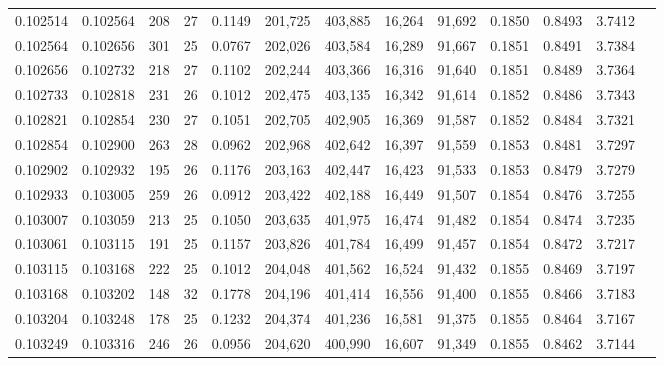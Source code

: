 \begin{tabular}{rrrrrrrrrrrrr}
0.102514 & 0.102564 & 208 &  27 &                                     0.1149 & 201,725 & 403,885 &  16,264 &  91,692 & 0.1850 & 0.8493 & 3.7412 \\
0.102564 & 0.102656 & 301 &  25 &                                     0.0767 & 202,026 & 403,584 &  16,289 &  91,667 & 0.1851 & 0.8491 & 3.7384 \\
0.102656 & 0.102732 & 218 &  27 &                                     0.1102 & 202,244 & 403,366 &  16,316 &  91,640 & 0.1851 & 0.8489 & 3.7364 \\
0.102733 & 0.102818 & 231 &  26 &                                     0.1012 & 202,475 & 403,135 &  16,342 &  91,614 & 0.1852 & 0.8486 & 3.7343 \\
0.102821 & 0.102854 & 230 &  27 &                                     0.1051 & 202,705 & 402,905 &  16,369 &  91,587 & 0.1852 & 0.8484 & 3.7321 \\
0.102854 & 0.102900 & 263 &  28 &                                     0.0962 & 202,968 & 402,642 &  16,397 &  91,559 & 0.1853 & 0.8481 & 3.7297 \\
0.102902 & 0.102932 & 195 &  26 &                                     0.1176 & 203,163 & 402,447 &  16,423 &  91,533 & 0.1853 & 0.8479 & 3.7279 \\
0.102933 & 0.103005 & 259 &  26 &                                     0.0912 & 203,422 & 402,188 &  16,449 &  91,507 & 0.1854 & 0.8476 & 3.7255 \\
0.103007 & 0.103059 & 213 &  25 &                                     0.1050 & 203,635 & 401,975 &  16,474 &  91,482 & 0.1854 & 0.8474 & 3.7235 \\
0.103061 & 0.103115 & 191 &  25 &                                     0.1157 & 203,826 & 401,784 &  16,499 &  91,457 & 0.1854 & 0.8472 & 3.7217 \\
0.103115 & 0.103168 & 222 &  25 &                                     0.1012 & 204,048 & 401,562 &  16,524 &  91,432 & 0.1855 & 0.8469 & 3.7197 \\
0.103168 & 0.103202 & 148 &  32 &                                     0.1778 & 204,196 & 401,414 &  16,556 &  91,400 & 0.1855 & 0.8466 & 3.7183 \\
0.103204 & 0.103248 & 178 &  25 &                                     0.1232 & 204,374 & 401,236 &  16,581 &  91,375 & 0.1855 & 0.8464 & 3.7167 \\
0.103249 & 0.103316 & 246 &  26 &                                     0.0956 & 204,620 & 400,990 &  16,607 &  91,349 & 0.1855 & 0.8462 & 3.7144 \\

\end{tabular}
